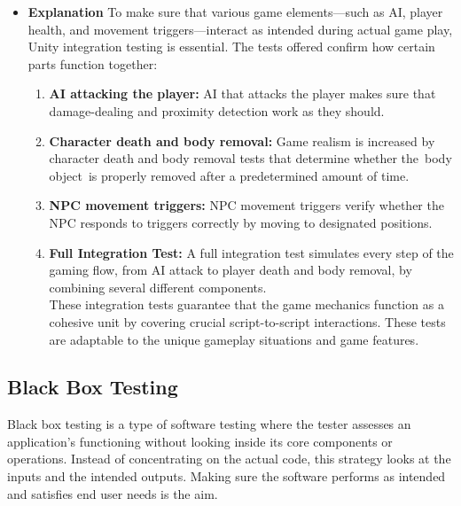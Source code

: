 \begin{itemize}
	\item  \textbf{Explanation}
	To make sure that various game elements—such as AI, player health, and movement triggers—interact as intended during actual game play, Unity integration testing is essential. The tests offered confirm how certain parts function together:
	\begin{enumerate}
		\item \textbf{AI attacking the player:} AI that attacks the player makes sure that damage-dealing and proximity detection work as they should.
		\item \textbf{Character death and body removal:} Game realism is increased by character death and body removal tests that determine whether the body object is properly removed after a predetermined amount of time.
		\item \textbf{NPC movement triggers:} NPC movement triggers verify whether the NPC responds to triggers correctly by moving to designated positions.
		\item \textbf{Full Integration Test:} A full integration test simulates every step of the gaming flow, from AI attack to player death and body removal, by combining several different components.\\
		These integration tests guarantee that the game mechanics function as a cohesive unit by covering crucial script-to-script interactions. These tests are adaptable to the unique gameplay situations and game features.
	\end{enumerate}
\end{itemize}
\subsection{Black Box Testing}
Black box testing is a type of software testing where the tester assesses an application's functioning without looking inside its core components or operations. Instead of concentrating on the actual code, this strategy looks at the inputs and the intended outputs. Making sure the software performs as intended and satisfies end user needs is the aim.
